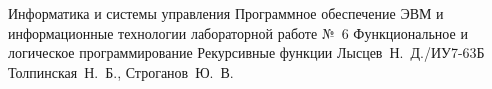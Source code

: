 \documentclass{bmstu}
\begin{document}
\makereporttitle
{Информатика и системы управления} %
{Программное обеспечение ЭВМ и информационные технологии}
{лабораторной работе №~6} %
{Функциональное и логическое программирование} %
{Рекурсивные функции} %
{} %
{Лысцев~Н.~Д./ИУ7-63Б} %
{Толпинская~Н.~Б., Строганов~Ю.~В.} %
{}


%

%
%
%

\end{document}
